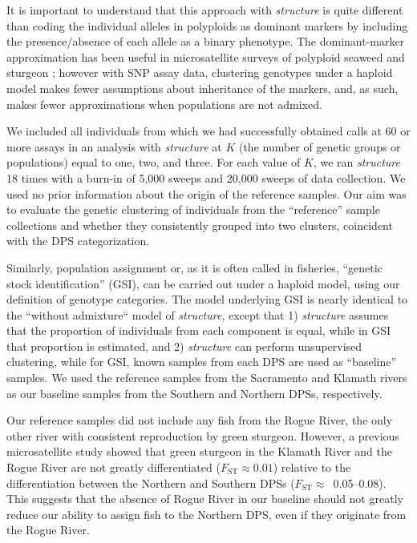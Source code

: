 \documentclass[twocolumn,natbib]{svjour3}       %
\begin{document}
It is important to understand that this approach with {\em structure}
is quite different than coding the individual alleles in polyploids as dominant
markers by including the presence/absence of each allele as a binary
phenotype.  The dominant-marker approximation has been useful in microsatellite 
surveys of polyploid seaweed and sturgeon \citep{andreakis2009high,schreier2013patterns}; however
with SNP assay data, clustering genotypes under a haploid model makes fewer 
assumptions about inheritance of the markers, and, as such, makes fewer approximations
when populations are not admixed.


We included all individuals from which we had successfully
obtained calls at 60 or more assays in an analysis with {\em structure} at $K$ (the number
of genetic groups or populations) equal to one, two, and three. For each value of
$K$, we ran {\em structure} 18 times with a burn-in of 5,000 sweeps and 20,000 
sweeps of data collection.  We used no prior information about the origin
of the reference samples. Our aim was to evaluate the genetic clustering of
individuals from the ``reference'' sample collections and whether they
consistently grouped into two clusters, coincident with the DPS categorization.

Similarly, population assignment or, as it is often called in
fisheries, ``genetic stock identification'' (GSI), can be carried out under a
haploid model, using our definition of genotype categories. The model underlying
GSI is nearly identical to the ``without admixture`` model of {\em structure}, except that 1)
{\em structure} assumes that the proportion of individuals from each component is
equal, while in GSI that proportion is estimated, and 2) {\em structure}
can perform unsupervised clustering, while for GSI, known samples from each
DPS are used as ``baseline'' samples. We used the reference samples from the Sacramento and
Klamath rivers as our baseline samples from the Southern and Northern DPSs,
respectively. 

Our reference samples did not include any fish from the 
Rogue River, the only other river with consistent reproduction by green sturgeon.  
However, a previous microsatellite study
\citep{Israeletal2009} showed that green
sturgeon in the Klamath River and the Rogue 
River are not greatly differentiated ($F_\mathrm{ST} \approx 0.01$) relative to the 
differentiation between the Northern and Southern DPSs ($F_\mathrm{ST}\approx$~0.05--0.08).
This suggests that the absence of Rogue River in our 
baseline should not greatly reduce our ability to assign fish to the Northern DPS, even if they 
originate from the Rogue River.  
\end{document}
